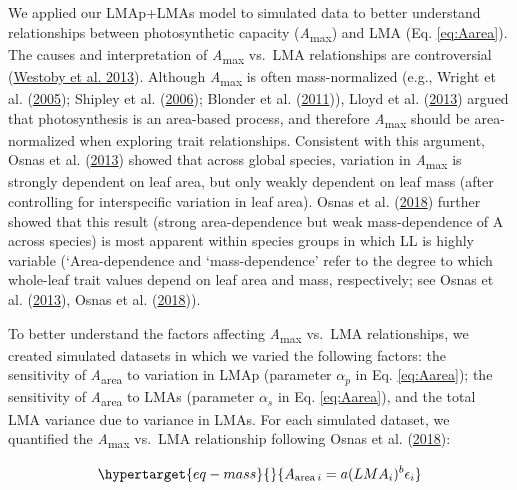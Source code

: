 \documentclass[
  12pt,
  a4paper,
,tablecaptionabove
]{scrartcl}
\begin{document}
We applied our LMAp+LMAs model to simulated data to better understand
relationships between photosynthetic capacity
(\emph{A}\textsubscript{max}) and LMA (Eq. \ref{eq:Aarea}). The causes
and interpretation of \emph{A}\textsubscript{max} vs.~LMA relationships
are controversial (\protect\hyperlink{ref-Westoby2013}{Westoby et al.
2013}). Although \emph{A}\textsubscript{max} is often mass-normalized
(e.g., Wright et al. (\protect\hyperlink{ref-Wright2005}{2005}); Shipley
et al. (\protect\hyperlink{ref-Shipley2006}{2006}); Blonder et al.
(\protect\hyperlink{ref-Blonder2011}{2011})), Lloyd et al.
(\protect\hyperlink{ref-Lloyd2013}{2013}) argued that photosynthesis is
an area-based process, and therefore \emph{A}\textsubscript{max} should
be area-normalized when exploring trait relationships. Consistent with
this argument, Osnas et al. (\protect\hyperlink{ref-Osnas2013}{2013})
showed that across global species, variation in
\emph{A}\textsubscript{max} is strongly dependent on leaf area, but only
weakly dependent on leaf mass (after controlling for interspecific
variation in leaf area). Osnas et al.
(\protect\hyperlink{ref-Osnas2018}{2018}) further showed that this
result (strong area-dependence but weak mass-dependence of A across
species) is most apparent within species groups in which LL is highly
variable (`Area-dependence and `mass-dependence' refer to the degree to
which whole-leaf trait values depend on leaf area and mass,
respectively; see Osnas et al.
(\protect\hyperlink{ref-Osnas2013}{2013}), Osnas et al.
(\protect\hyperlink{ref-Osnas2018}{2018})).

To better understand the factors affecting \emph{A}\textsubscript{max}
vs.~LMA relationships, we created simulated datasets in which we varied
the following factors: the sensitivity of \emph{A}\textsubscript{area}
to variation in LMAp (parameter \(\alpha_p\) in Eq. \ref{eq:Aarea}); the
sensitivity of \emph{A}\textsubscript{area} to LMAs (parameter
\(\alpha_s\) in Eq. \ref{eq:Aarea}), and the total LMA variance due to
variance in LMAs. For each simulated dataset, we quantified the
\emph{A}\textsubscript{max} vs.~LMA relationship following Osnas et al.
(\protect\hyperlink{ref-Osnas2018}{2018}):

\begin{equation}\protect\hypertarget{eq-mass}{}{
A_{\mathrm{area} \, i} = a (LMA_i)^{b}\epsilon_i
}\label{eq-mass}\end{equation}
\end{document}
